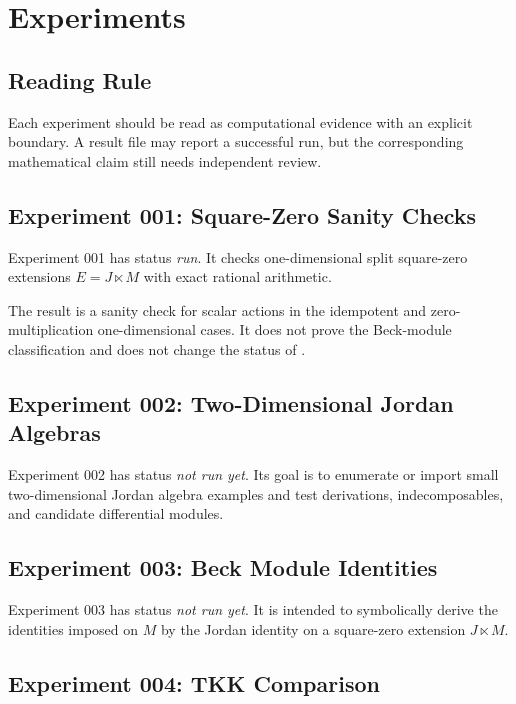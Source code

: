 \chapter{Experiments}

\section{Reading Rule}

Each experiment should be read as computational evidence with an explicit
boundary. A result file may report a successful run, but the corresponding
mathematical claim still needs independent review.

\section{Experiment 001: Square-Zero Sanity Checks}

Experiment 001 has status \emph{run}. It checks one-dimensional split
square-zero extensions \(E = J \ltimes M\) with exact rational arithmetic.

The result is a sanity check for scalar actions in the idempotent and
zero-multiplication one-dimensional cases. It does not prove the Beck-module
classification and does not change the status of .

\section{Experiment 002: Two-Dimensional Jordan Algebras}

Experiment 002 has status \emph{not run yet}. Its goal is to enumerate or
import small two-dimensional Jordan algebra examples and test derivations,
indecomposables, and candidate differential modules.

\section{Experiment 003: Beck Module Identities}

Experiment 003 has status \emph{not run yet}. It is intended to symbolically
derive the identities imposed on \(M\) by the Jordan identity on a square-zero
extension \(J \ltimes M\).

\section{Experiment 004: TKK Comparison}

